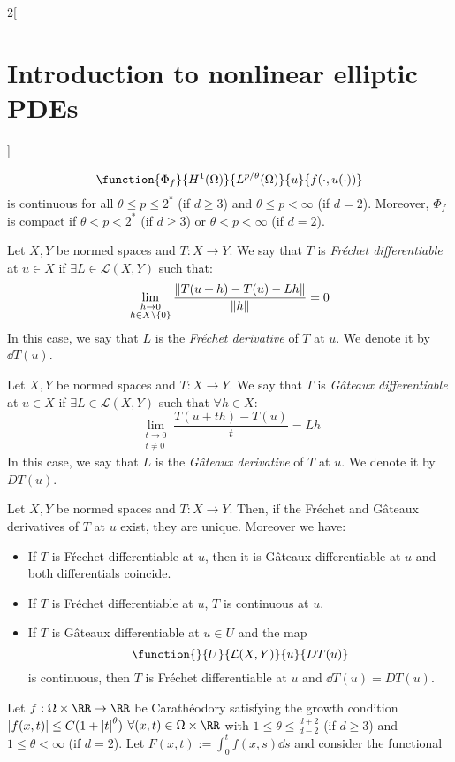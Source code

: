 \documentclass[../../../main_math.tex]{subfiles}
\begin{document}
\begin{multicols}{2}[\section{Introduction to nonlinear elliptic PDEs}]
\begin{proposition}
    $$
      \function{\Phi_f}{H^1(\Omega)}{L^{p/\theta}(\Omega)}{u}{f(\cdot,u(\cdot))}
    $$
    is continuous for all $\theta \leq p\leq 2^*$ (if $d\geq 3$) and $\theta\leq p<\infty$ (if $d=2$). Moreover, $\Phi_f$ is compact if $\theta<p<2^*$ (if $d\geq 3$) or $\theta<p<\infty$ (if $d=2$).
  \end{proposition}
  \begin{definition}
    Let $X,Y$ be normed spaces and $T:X\to Y$. We say that $T$ is \emph{Fréchet differentiable} at $u\in X$ if $\exists L\in \mathcal{L}(X,Y)$ such that:
    $$
      \lim_{\substack{h\to 0\\h\in X\setminus\{0\}}}\frac{\norm{T(u+h)-T(u)-Lh}}{\norm{h}}=0
    $$
    In this case, we say that $L$ is the \emph{Fréchet derivative} of $T$ at $u$. We denote it by $\dd{T(u)}$.
  \end{definition}
  \begin{definition}
    Let $X,Y$ be normed spaces and $T:X\to Y$. We say that $T$ is \emph{Gâteaux differentiable} at $u\in X$ if $\exists L\in \mathcal{L}(X,Y)$ such that $\forall h\in X$:
    $$
      \lim_{\substack{t\to 0\\t\ne 0}}\frac{T(u+th)-T(u)}{t}=Lh
    $$
    In this case, we say that $L$ is the \emph{Gâteaux derivative} of $T$ at $u$. We denote it by $D{T}(u)$.
  \end{definition}
  \begin{lemma}
    Let $X,Y$ be normed spaces and $T:X\to Y$. Then, if the Fréchet and Gâteaux derivatives of $T$ at $u$ exist, they are unique. Moreover we have:
    \begin{itemize}
      \item If $T$ is Fŕechet differentiable at $u$, then it is Gâteaux differentiable at $u$ and both differentials coincide.
      \item If $T$ is Fréchet differentiable at $u$, $T$ is continuous at $u$.
      \item If $T$ is Gâteaux differentiable at $u\in U$ and the map
            $$
              \function{}{U}{\mathcal{L}(X,Y)}{u}{DT(u)}
            $$
            is continuous, then $T$ is Fréchet differentiable at $u$ and $\dd{T(u)}=DT(u)$.
    \end{itemize}
  \end{lemma}
  \begin{proposition}\label{INEPDE:minimization_prop2}
    Let $f:\Omega\times \RR\to\RR$ be Carathéodory satisfying the growth condition $\abs{f(x,t)}\leq C(1+\abs{t}^\theta)$ $\forall (x,t)\in \Omega\times \RR$ with $1\leq \theta\leq \frac{d+2}{d-2}$ (if $d\geq 3$) and $1\leq \theta<\infty$ (if $d=2$). Let $F(x,t):=\int_0^tf(x,s)\dd{s}$ and consider the functional

\end{proposition}
\end{multicols}
\end{document}
